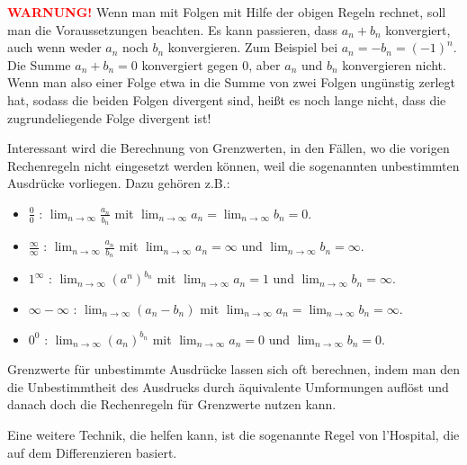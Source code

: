 \begin{bem}
	\textcolor{red}{\textbf{WARNUNG!}}
	Wenn man mit Folgen mit Hilfe der obigen Regeln rechnet, soll man die Voraussetzungen beachten. Es kann passieren, dass $a_n + b_n$ konvergiert, auch wenn weder $a_n$ noch $b_n$ konvergieren. Zum Beispiel bei $a_n = - b_n = (-1)^n$. Die Summe $a_n + b_n = 0$ konvergiert gegen $0$, aber $a_n$ und $b_n$ konvergieren nicht. Wenn man also einer Folge etwa in die Summe von zwei Folgen ungünstig zerlegt hat, sodass die beiden Folgen divergent sind, heißt es noch lange nicht, dass die zugrundeliegende Folge divergent ist!
\end{bem} 

\begin{bem} 
	Interessant wird die Berechnung von Grenzwerten, in den Fällen, wo die vorigen Rechenregeln nicht eingesetzt werden können, weil die sogenannten unbestimmten Ausdrücke vorliegen. Dazu gehören z.B.: 
	\begin{itemize} 
			\item[] {\color{red} \glqq $\frac{0}{0}$ \grqq:}  $\lim_{n \to \infty} \frac{a_n}{b_n}$ mit $\lim_{n \to \infty} a_n = \lim_{n \to \infty} b_n= 0$. 
			\item[] {\color{red} \glqq$\frac{\infty}{\infty}$ \grqq:}   $\lim_{n \to \infty} \frac{a_n}{b_n}$ mit $\lim_{n \to \infty} a_n  = \infty $ und $\lim_{n \to \infty} b_n  = \infty$. 
			\item[] {\color{red} \glqq$1^\infty$ \grqq: } $\lim_{n \to \infty} (a^n )^{b_n}$ mit $\lim_{n \to \infty} a _n = 1$ und $\lim_{n \to \infty} b_n = \infty$. 
			\item[]  {\color{red} \glqq $\infty - \infty$ \grqq: } $\lim_{n \to \infty} (a_n -b_n)$ mit $\lim_{n \to \infty} a_n = \lim_{n \to \infty} b_n = \infty$. 
			\item[] {\color{red} \glqq$0^0$ \grqq: } $\lim_{n \to \infty} (a_n )^{b_n}$ mit $\lim_{n \to \infty} a _n = 0$ und $\lim_{n \to \infty} b_n = 0$. 
	\end{itemize} 
	Grenzwerte für unbestimmte Ausdrücke lassen sich oft berechnen, indem man den die Unbestimmtheit des Ausdrucks durch äquivalente Umformungen auflöst und danach doch die Rechenregeln für Grenzwerte nutzen kann. 
	
	Eine weitere Technik, die helfen kann, ist die sogenannte Regel von l'Hospital, die auf dem Differenzieren basiert. 
\end{bem} 



